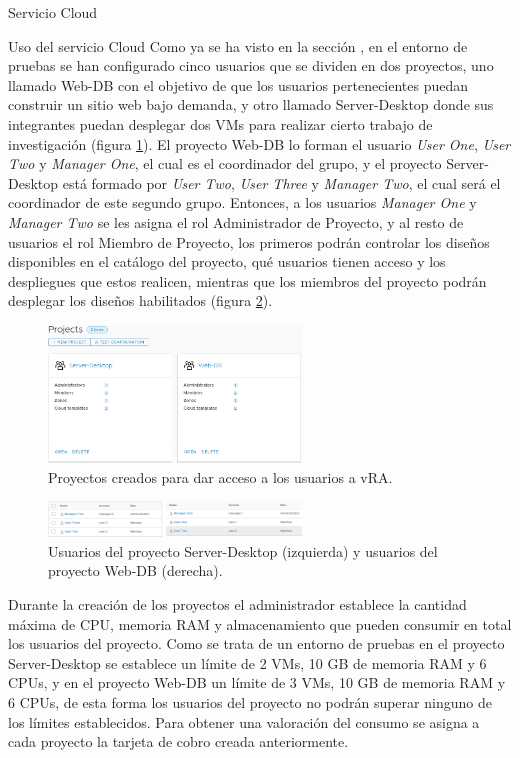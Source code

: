 \begin{subsection}{Servicio Cloud}
\begin{subsubsection}{Uso del servicio Cloud}
        Como ya se ha visto en la sección , en el entorno de pruebas se han configurado cinco usuarios que se dividen en dos proyectos, uno llamado Web-DB con el objetivo de que los usuarios pertenecientes puedan construir un sitio web bajo demanda, y otro llamado Server-Desktop donde sus integrantes puedan desplegar dos VMs para realizar cierto trabajo de investigación (figura \ref{fig:projects-vra}). El proyecto Web-DB lo forman el usuario \textit{User One}, \textit{User Two} y \textit{Manager One}, el cual es el coordinador del grupo, y el proyecto Server-Desktop está formado por \textit{User Two}, \textit{User Three} y \textit{Manager Two}, el cual será el coordinador de este segundo grupo. Entonces, a los usuarios \textit{Manager One} y \textit{Manager Two} se les asigna el rol Administrador de Proyecto, y al resto de usuarios el rol Miembro de Proyecto, los primeros podrán controlar los diseños disponibles en el catálogo del proyecto, qué usuarios tienen acceso y los despliegues que estos realicen, mientras que los miembros del proyecto podrán desplegar los diseños habilitados (figura \ref{fig:project-users}).
        \begin{figure}[h]
            \centering
            \includegraphics[width=0.6\textwidth]{imaxes/pruebaconcepto/vrealize/projects-vRA.png}
            \caption{Proyectos creados para dar acceso a los usuarios a vRA.}
            \label{fig:projects-vra}
        \end{figure}
        \FloatBarrier
        \begin{figure}[h]
            \centering
            \includegraphics[width=0.6\textwidth]{imaxes/pruebaconcepto/vrealize/users-DB.png}
            \caption{Usuarios del proyecto Server-Desktop (izquierda) y usuarios del proyecto Web-DB (derecha).}
            \label{fig:project-users}
        \end{figure}
        \FloatBarrier
        Durante la creación de los proyectos el administrador establece la cantidad máxima de CPU, memoria RAM y almacenamiento que pueden consumir en total los usuarios del proyecto. Como se trata de un entorno de pruebas en el proyecto Server-Desktop se establece un límite de 2 VMs, 10 GB de memoria RAM y 6 CPUs, y en el proyecto Web-DB un límite de 3 VMs, 10 GB de memoria RAM y 6 CPUs, de esta forma los usuarios del proyecto no podrán superar ninguno de los límites establecidos. Para obtener una valoración del consumo se asigna a cada proyecto la tarjeta de cobro creada anteriormente.

\end{subsubsection}
\end{subsection}

